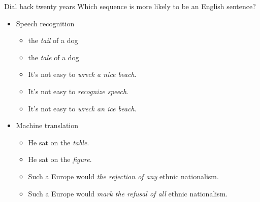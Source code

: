 \documentclass[usenames,dvipsnames,notes,11pt,aspectratio=169,hyperref={colorlinks=true, linkcolor=blue}]{beamer}
\newcommand{\pdfnote}[1]{}
\begin{document}
\begin{frame}
    {Dial back twenty years}
    Which sequence is more likely to be an English sentence?
    \begin{itemize}
        \item Speech recognition
            \begin{itemize}
                \item[] the \textit{tail} of a dog
                \item[] the \textit{tale} of a dog
            \end{itemize}
            \begin{itemize}
                \item[] It's not easy to \textit{wreck a nice beach}. 
                \item[] It's not easy to \textit{recognize speech}. 
                \item[] It's not easy to \textit{wreck an ice beach}.
            \end{itemize}
        \item Machine translation 
            \begin{itemize}
                \item[] He sat on the \textit{table}.
                \item[] He sat on the \textit{figure}.
            \end{itemize}
            \begin{itemize}
                \item[] Such a Europe would \textit{the rejection of any} ethnic nationalism. 
                \item[] Such a Europe would \textit{mark the refusal of all} ethnic nationalism. 
            \end{itemize}
    \end{itemize}
    \pdfnote{
        In earlier systems of speech recognition and machine translation,
        the acousitic model and the translation model would produce multiple rough translations, and the language model is used to reweight these outputs by how likely they are English sentences.
    }
\end{frame}
\end{document}
